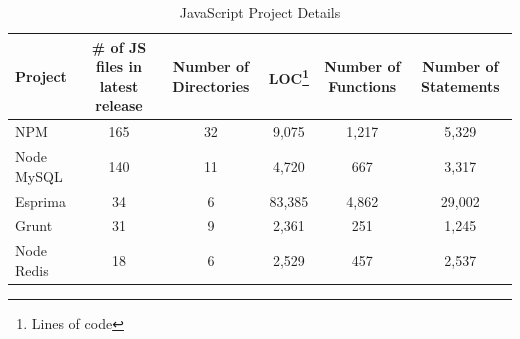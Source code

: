 \begin{table}[!tbh]
	\begin{center}
		\caption{JavaScript Project Details }
		\label{tab:java_script_proj_details}
		\begin{tabular}{l| c c c c c}
			\toprule
			\textbf{Project} & \textbf{\# of JS files in latest release} & \textbf{Number of Directories} & \textbf{LOC\footnote{Lines of code}} & \textbf{Number of Functions} & \textbf{Number of Statements} \\ 
			\midrule
			NPM              & 165                                       & 32                             & 9,075                                & 1,217                        & 5,329                         \\
			Node MySQL       & 140                                       & 11                             & 4,720                                & 667                          & 3,317                         \\
			Esprima          & 34                                        & 6                              & 83,385                               & 4,862                        & 29,002                        \\
			Grunt            & 31                                        & 9                              & 2,361                                & 251                          & 1,245                         \\
			Node Redis       & 18                                        & 6                              & 2,529                                & 457                          & 2,537                         \\ 
			\bottomrule
		\end{tabular}
	\end{center}
\end{table}

